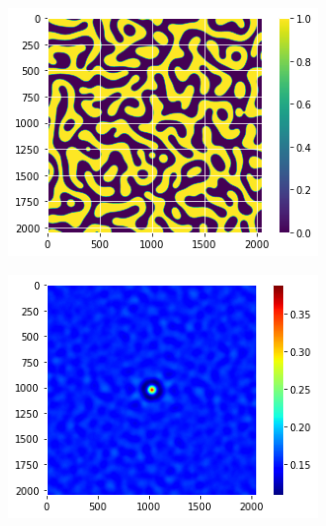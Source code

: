 \documentclass[12pt, a4paper]{report}
\begin{document}
\begin{figure}[H]
\centering
\begin{subfigure}{.32\textwidth}
  \centering
  \includegraphics[width=0.9\textwidth]{Pictures/MSFeatures/CorrImageChosen.png}
  \label{img:microstrImg}
\end{subfigure}
\begin{subfigure}{.32\textwidth}
  \centering
  \includegraphics[width=0.9\textwidth]{Pictures/MSFeatures/CorrImageAuto.png}
  \label{img:microstrImg}
\end{subfigure}
\begin{subfigure}{.32\textwidth}
  \centering

\end{subfigure}
\end{figure}
\end{document}
